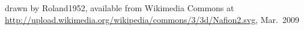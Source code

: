 drawn by Roland1952, available from Wikimedia Commons at \url{http://upload.wikimedia.org/wikipedia/commons/3/3d/Nafion2.svg}, Mar.\ 2009%

